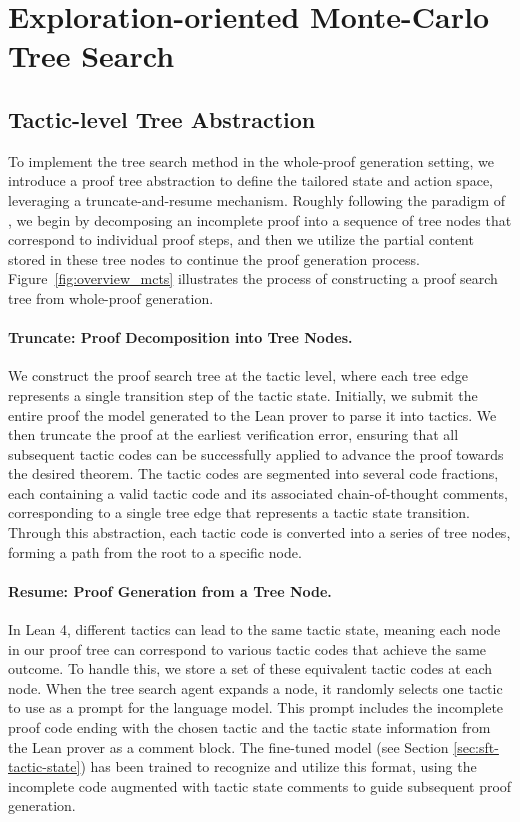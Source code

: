 \section{Exploration-oriented Monte-Carlo Tree Search} \label{sec:tree-search}

\subsection{Tactic-level Tree Abstraction} \label{sec:tree-abstraction}

To implement the tree search method in the whole-proof generation setting, we introduce a proof tree abstraction to define the tailored state and action space, leveraging a truncate-and-resume mechanism.
Roughly following the paradigm of \citet{yao2023tree}, we begin by decomposing an incomplete proof into a sequence of tree nodes that correspond to individual proof steps, and then we utilize the partial content stored in these tree nodes to continue the proof generation process.
Figure~\ref{fig:overview_mcts} illustrates the process of constructing a proof search tree from whole-proof generation.

\paragraph{Truncate: Proof Decomposition into Tree Nodes.}
We construct the proof search tree at the tactic level, where each tree edge represents a single transition step of the tactic state. Initially, we submit the entire proof the model generated to the Lean prover to parse it into tactics. We then truncate the proof at the earliest verification error, ensuring that all subsequent tactic codes can be successfully applied to advance the proof towards the desired theorem. The tactic codes are segmented into several code fractions, each containing a valid tactic code and its associated chain-of-thought comments, corresponding to a single tree edge that represents a tactic state transition. Through this abstraction, each tactic code is converted into a series of tree nodes, forming a path from the root to a specific node.

\paragraph{Resume: Proof Generation from a Tree Node.}
In Lean 4, different tactics can lead to the same tactic state, meaning each node in our proof tree can correspond to various tactic codes that achieve the same outcome. To handle this, we store a set of these equivalent tactic codes at each node. When the tree search agent expands a node, it randomly selects one tactic to use as a prompt for the language model. This prompt includes the incomplete proof code ending with the chosen tactic and the tactic state information from the Lean prover as a comment block. The fine-tuned model (see Section \ref{sec:sft-tactic-state}) has been trained to recognize and utilize this format, using the incomplete code augmented with tactic state comments to guide subsequent proof generation.

